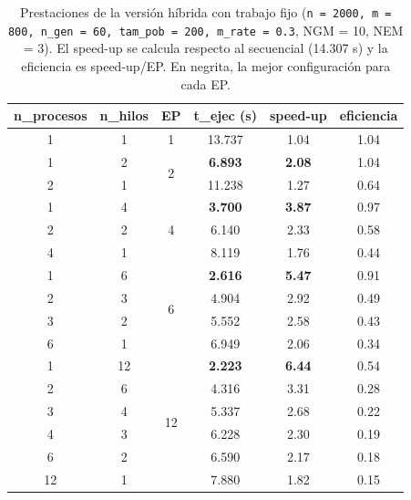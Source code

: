 \documentclass[12pt]{article}
\begin{document}
\begin{enumerate}
\begin{table}[htbp]
\centering
\begin{tabular}{ccc|ccc}
\toprule
\textbf{n\_procesos} & \textbf{n\_hilos} & \textbf{EP} & \textbf{t\_ejec (s)} & \textbf{speed-up} & \textbf{eficiencia} \\
\midrule
1 & 1 & 1 & 13.737 & 1.04 & 1.04 \\
\midrule
1 & 2 & \multirow{2}{*}{2} & \textbf{6.893} & \textbf{2.08} & 1.04 \\
2 & 1 & & 11.238 & 1.27 & 0.64 \\
\midrule
1 & 4 & \multirow{3}{*}{4} & \textbf{3.700} & \textbf{3.87} & 0.97 \\
2 & 2 & & 6.140 & 2.33 & 0.58 \\
4 & 1 & & 8.119 & 1.76 & 0.44 \\
\midrule
1 & 6 & \multirow{4}{*}{6} & \textbf{2.616} & \textbf{5.47} & 0.91 \\
2 & 3 & & 4.904 & 2.92 & 0.49 \\
3 & 2 & & 5.552 & 2.58 & 0.43 \\
6 & 1 & & 6.949 & 2.06 & 0.34 \\
\midrule
1 & 12 & \multirow{6}{*}{12} & \textbf{2.223} & \textbf{6.44} & 0.54 \\
2 & 6 & & 4.316 & 3.31 & 0.28 \\
3 & 4 & & 5.337 & 2.68 & 0.22 \\
4 & 3 & & 6.228 & 2.30 & 0.19 \\
6 & 2 & & 6.590 & 2.17 & 0.18 \\
12 & 1 & & 7.880 & 1.82 & 0.15 \\
\bottomrule
\end{tabular}
\caption{Prestaciones de la versión híbrida con trabajo fijo (\texttt{n = 2000, m = 800, n\_gen = 60, tam\_pob = 200, m\_rate = 0.3}, NGM = 10, NEM = 3). El speed-up se calcula respecto al secuencial (14.307 s) y la eficiencia es speed-up/EP. En negrita, la mejor configuración para cada EP.}
\label{tab:c2_hibrido}
\end{table}


\end{enumerate}
\end{document}
